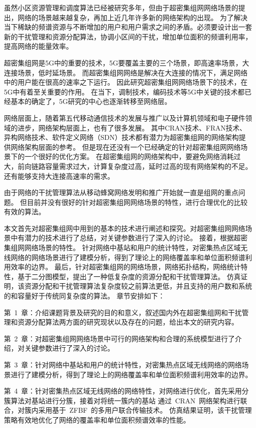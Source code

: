 虽然小区资源管理和调度算法已经被研究多年，但由于超密集组网网络场景的提出，网络的场景越来越复杂，再加上近几年许多新的网络架构的出现。
为了解决当下稀缺的频谱资源与不断增加的用户和用户需求之间的矛盾。必须要设计出一套新的干扰管理和资源分配算法，协调小区间的干扰，增加单位面积的频谱利用率，提高网络的能量效率。


超密集组网是5G中的重要的技术，5G要覆盖主要的三个场景，即高速率场景，大连接场景，低时延场景。
而超密集组网网络是解决在大连接的情况下，满足网络中的用户能在很高的速率之下运行。
因此研究超密集组网网络场景下的技术，在5G中有着至关重要的作用。
在当下，调制技术，编码技术等5G中关键的技术都已经基本的确定了，5G研究的中心也逐渐转移至网络层。

网络层面上，随着第五代移动通信技术的发展与推广以及计算机领域和电子硬件领域的进步，网络架构层面上，也有了很多发展。
其中CRAN技术、FRAN技术、异构网络技术、软件定义网络（SDN）技术都有潜力为超密集组网的网络架构提供网络架构层面的参考。
但是现在还没有一个已经确定的针对超密集组网网络场景下的一个很好的优化方案。
在超密集组网的网络架构中，要避免网络消耗过大，前向链路容量需求过大，计算复杂度过高，延时过高的现有网络架构的不足。
还有能够支持大连接高速率的需求。

由于网络的干扰管理算法从移动蜂窝网络发明和推广开始就一直是组网的重点问题。
但目前并没有很好的针对超密集组网网络场景的特性，进行合理优化的比较有效的算法。



本文首先对超密集组网中用到的基本的技术进行阐述和探究。对超密集组网网络场景中有潜力的技术进行了总结，对关键参数进行了深入的讨论。
接着，根据超密集组网网络场景的特性。
针对网络中基站和用户的统计特性，对密集热点区域无线网络的网络场景进行了建模分析，得到了理论上的网络覆盖率和单位面积频谱利用效率的边界。
最后，针对超密集组网的网络场景，网络拓扑结构，网络统计特性，基于二分图模型，提出了一种低复杂度的资源分配和干扰管理算法。
仿真证明，该资源分配和干扰管理算法复杂度较之前算法更低，并且支持的用户数和系统的和容量好于传统同复杂度的算法。
章节安排如下：

第~1~章：介绍课题背景及研究的目的和意义，叙述国内外在超密集组网和干扰管理和资源分配算法两方面的研究现状以及存在的问题，给出本文的研究内容。

第~2~章：对超密集组网网络场景中可行的网络架构和合理的系统模型进行了介绍，对关键参数进行了深入的讨论。

第~3~章：针对网络中基站和用户的统计特性，对密集热点区域无线网络的网络场景进行了建模分析，得到了理论上的网络覆盖率和单位面积频谱利用效率的边界。

第~4~章：针对密集热点区域无线网络的网络特性，对网络进行优化，首先采用分簇算法对基站进行分簇，接着对将统一簇内的基站
通过~CRAN~网络架构进行联合，对簇内采用基于~ZFBF~的多用户联合传输技术。
仿真结果证明，该干扰管理策略有效地优化了网络的覆盖率和单位面积频谱效率的性能。
